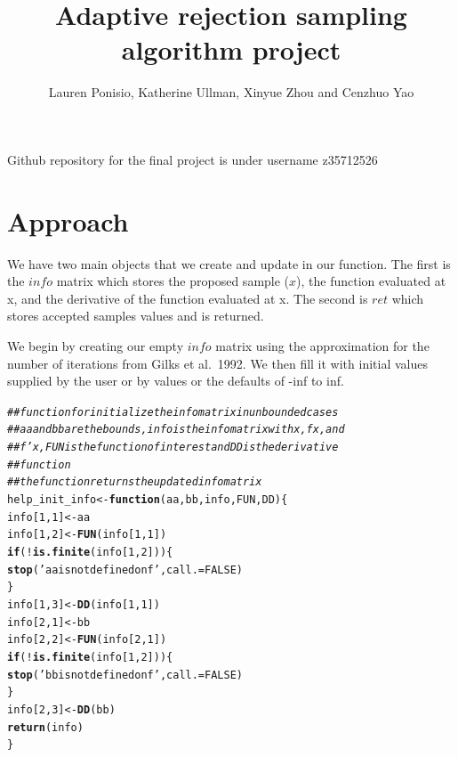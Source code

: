 \documentclass{article}\usepackage[]{graphicx}\usepackage[]{color}
\makeatletter
\newcommand{\hlnum}[1]{\textcolor[rgb]{0.686,0.059,0.569}{#1}}%
\newcommand{\hlstr}[1]{\textcolor[rgb]{0.192,0.494,0.8}{#1}}%
\newcommand{\hlcom}[1]{\textcolor[rgb]{0.678,0.584,0.686}{\textit{#1}}}%
\newcommand{\hlopt}[1]{\textcolor[rgb]{0,0,0}{#1}}%
\newcommand{\hlstd}[1]{\textcolor[rgb]{0.345,0.345,0.345}{#1}}%
\newcommand{\hlkwa}[1]{\textcolor[rgb]{0.161,0.373,0.58}{\textbf{#1}}}%
\newcommand{\hlkwb}[1]{\textcolor[rgb]{0.69,0.353,0.396}{#1}}%
\newcommand{\hlkwc}[1]{\textcolor[rgb]{0.333,0.667,0.333}{#1}}%
\newcommand{\hlkwd}[1]{\textcolor[rgb]{0.737,0.353,0.396}{\textbf{#1}}}%
\newenvironment{kframe}{%
 \def\at@end@of@kframe{}%
 \ifinner\ifhmode%
  \def\at@end@of@kframe{\end{minipage}}%
  \begin{minipage}{\columnwidth}%
 \fi\fi%
 \def\FrameCommand##1{\hskip\@totalleftmargin \hskip-\fboxsep
 \colorbox{shadecolor}{##1}\hskip-\fboxsep
     \hskip-\linewidth \hskip-\@totalleftmargin \hskip\columnwidth}%
 \MakeFramed {\advance\hsize-\width
   \@totalleftmargin\z@ \linewidth\hsize
   \@setminipage}}%
 {\par\unskip\endMakeFramed%
 \at@end@of@kframe}
\newenvironment{knitrout}{}{} %
\makeatother
\begin{document}
\title{Adaptive rejection sampling algorithm project}
\author{Lauren Ponisio, Katherine Ullman, Xinyue Zhou and Cenzhuo Yao}

\maketitle

Github repository for the final project is under username z35712526

\section{Approach}

We have two main objects that we create and update in our
function. The first is the $info$ matrix which stores the proposed
sample ($x$), the function evaluated at x, and the derivative of the
function evaluated at x. The second is $ret$ which stores accepted
samples values and is returned. 

We begin by creating our empty $info$ matrix using the approximation
for the number of iterations from Gilks et al.~1992. We then fill it
with initial values supplied by the user or by values or the defaults
of -inf to inf.

\begin{knitrout}
\color{fgcolor}\begin{kframe}
\begin{alltt}
\hlcom{## function for initialize the info matrix in unbounded cases}
\hlcom{## aa and bb are the bounds, info is the info matrix with x, fx, and}
\hlcom{## f'x, FUN is the function of interest and DD is the derivative}
\hlcom{## function}
\hlcom{## the function returns the updated info matrix}
\hlstd{help_init_info} \hlkwb{<-} \hlkwa{function} \hlstd{(}\hlkwc{aa}\hlstd{,} \hlkwc{bb}\hlstd{,} \hlkwc{info}\hlstd{,} \hlkwc{FUN}\hlstd{,} \hlkwc{DD}\hlstd{)\{}
  \hlstd{info[}\hlnum{1}\hlstd{,} \hlnum{1}\hlstd{]} \hlkwb{<-} \hlstd{aa}
  \hlstd{info[}\hlnum{1}\hlstd{,} \hlnum{2}\hlstd{]} \hlkwb{<-} \hlkwd{FUN}\hlstd{(info[}\hlnum{1}\hlstd{,} \hlnum{1}\hlstd{])}
  \hlkwa{if}\hlstd{(}\hlopt{!}\hlkwd{is.finite}\hlstd{(info[}\hlnum{1}\hlstd{,} \hlnum{2}\hlstd{])) \{}
    \hlkwd{stop}\hlstd{(}\hlstr{'aa is not defined on f'}\hlstd{,} \hlkwc{call.} \hlstd{=} \hlnum{FALSE}\hlstd{)}
  \hlstd{\}}
  \hlstd{info[}\hlnum{1}\hlstd{,} \hlnum{3}\hlstd{]} \hlkwb{<-} \hlkwd{DD}\hlstd{(info[}\hlnum{1}\hlstd{,} \hlnum{1}\hlstd{])}
  \hlstd{info[}\hlnum{2}\hlstd{,} \hlnum{1}\hlstd{]} \hlkwb{<-} \hlstd{bb}
  \hlstd{info[}\hlnum{2}\hlstd{,} \hlnum{2}\hlstd{]} \hlkwb{<-} \hlkwd{FUN}\hlstd{(info[}\hlnum{2}\hlstd{,} \hlnum{1}\hlstd{])}
  \hlkwa{if}\hlstd{(}\hlopt{!}\hlkwd{is.finite}\hlstd{(info[}\hlnum{1}\hlstd{,} \hlnum{2}\hlstd{])) \{}
    \hlkwd{stop}\hlstd{(}\hlstr{'bb is not defined on f'}\hlstd{,} \hlkwc{call.} \hlstd{=} \hlnum{FALSE}\hlstd{)}
  \hlstd{\}}
  \hlstd{info [}\hlnum{2}\hlstd{,} \hlnum{3}\hlstd{]} \hlkwb{<-} \hlkwd{DD}\hlstd{(bb)}
  \hlkwd{return}\hlstd{(info)}
\hlstd{\}}
\end{alltt}
\end{kframe}
\end{knitrout}
\end{document}
